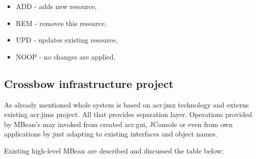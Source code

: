 \documentclass[11pt]{book}
\begin{document}
        \begin{itemize}
        \item {ADD - adds new resource,}
        \item {REM - removes this resource,}
        \item {UPD - updates existing resource,}
        \item {NOOP - no changes are applied.}
        \end{itemize}


		\subsection{Crossbow infrastructure project}
			\label{sec:impl:infrastructure}
			
      As already mentioned whole system is based on \gls{acr:jmx} technology and externs existing \gls{acr:jims}
      project. All that provides separation layer. Operations provided by MBean's may invoked from created
      \gls{acr:gui}, JConsole or even from own applications by just adapting to existing interfaces and object names. 
			
			Existing high-level MBean are described and discussed the table below:
\end{document}
